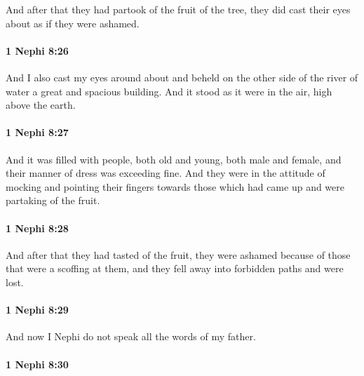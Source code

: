			And after that they had partook of the fruit of the tree,
			they did cast their eyes about as if they were ashamed.

		\paragraph{1 Nephi 8:26} %
			\label{1NEPHI-8-26}

			And I also cast my eyes around about
			and beheld on the other side of the river of water a great and spacious building.
			And it stood as it were in the air, high above the earth.

		\paragraph{1 Nephi 8:27} %
			\label{1NEPHI-8-27}

			And it was filled with people, both old and young, both male and female,
			and their manner of dress was exceeding fine.
			And they were in the attitude of mocking and pointing their fingers
			towards those which had came up and were partaking of the fruit.

		\paragraph{1 Nephi 8:28} %
			\label{1NEPHI-8-28}

			And after that they had tasted of the fruit, they were ashamed
			because of those that were a scoffing at them,
			and they fell away into forbidden paths and were lost.

		\paragraph{1 Nephi 8:29} %
			\label{1NEPHI-8-29}

			And now I Nephi do not speak all the words of my father.

		\paragraph{1 Nephi 8:30} %
			\label{1NEPHI-8-30}

